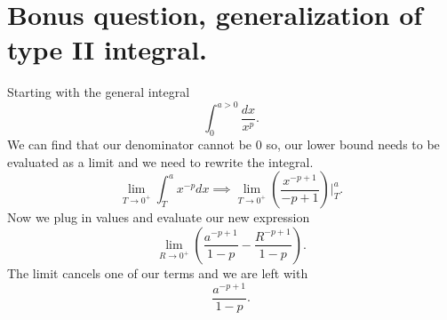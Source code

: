 \section*{Bonus question, generalization of type II integral.}%
Starting with the general integral
\[
\int_{0}^{a>0} \frac{dx}{x^{p}}
.\] 
We can find that our denominator cannot be 0 so, our lower bound needs to be evaluated as a limit and we need to rewrite the integral.
\[
\lim_{T \to 0^{+}} \int_{T}^{a} x^{-p}dx \implies \lim_{T \to 0^{+}} \left( \frac{x^{-p+1}}{-p+1} \right) \Big|_{T}^{a}
.\] 
Now we plug in values and evaluate our new expression
\[
\lim_{R \to 0^{+}} \left( \frac{a^{-p+1}}{1-p}- \frac{R^{-p+1}}{1-p} \right) 
.\] 
The limit cancels one of our terms and we are left with
\[
\frac{a^{-p+1}}{1-p}
.\] 
